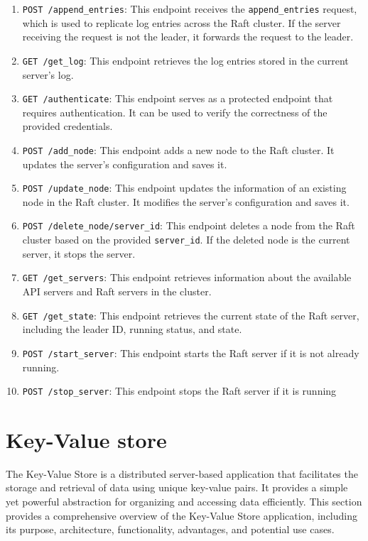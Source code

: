\documentclass{article}
\begin{document}
\begin{enumerate}
	\item \texttt{POST /append\_entries}: This endpoint receives the \texttt{append\_entries} request, which is used to replicate log entries across the Raft cluster. If the server receiving the request is not the leader, it forwards the request to the leader.
	\item \texttt{GET /get\_log}: This endpoint retrieves the log entries stored in the current server's log.
	\item \texttt{GET /authenticate}: This endpoint serves as a protected endpoint that requires authentication. It can be used to verify the correctness of the provided credentials.
	\item \texttt{POST /add\_node}: This endpoint adds a new node to the Raft cluster. It updates the server's configuration and saves it.
	\item \texttt{POST /update\_node}: This endpoint updates the information of an existing node in the Raft cluster. It modifies the server's configuration and saves it.
	\item \texttt{POST /delete\_node/{server\_id}}: This endpoint deletes a node from the Raft cluster based on the provided \texttt{server\_id}. If the deleted node is the current server, it stops the server.
	\item \texttt{GET /get\_servers}: This endpoint retrieves information about the available API servers and Raft servers in the cluster.
	\item \texttt{GET /get\_state}: This endpoint retrieves the current state of the Raft server, including the leader ID, running status, and state.
	\item \texttt{POST /start\_server}: This endpoint starts the Raft server if it is not already running.
	\item \texttt{POST /stop\_server}: This endpoint stops the Raft server if it is running
\end{enumerate}


\section{Key-Value store}
The Key-Value Store is a distributed server-based application that facilitates the storage
and retrieval of data using unique key-value pairs. It provides a simple yet powerful
abstraction for organizing and accessing data efficiently. This section provides a comprehensive
overview of the Key-Value Store application, including its purpose, architecture, functionality,
advantages, and potential use cases.
\end{document}
